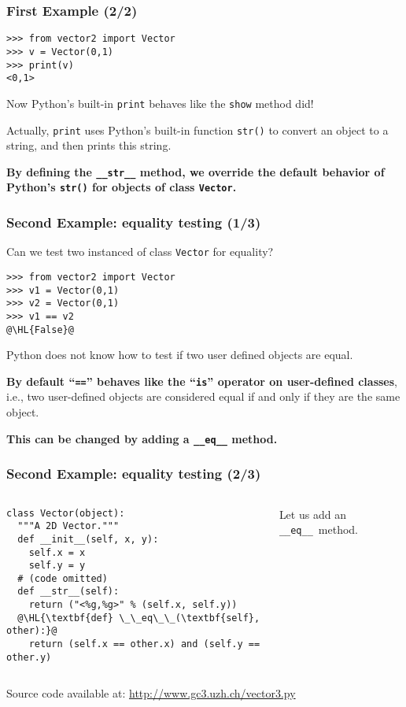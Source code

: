 \documentclass[english,serif,mathserif,xcolor=pdftex,dvipsnames,table]{beamer}
\begin{document}
\begin{frame}[fragile]
  \frametitle{First Example (2/2)}
\begin{lstlisting}
>>> from vector2 import Vector
>>> v = Vector(0,1)
>>> print(v)
<0,1>
\end{lstlisting}

  \+
  Now Python's built-in \texttt{print} behaves like the \texttt{show} method did!

  \+ Actually, \texttt{print} uses Python's built-in function
  \texttt{str()} to convert an object to a string, and then prints
  this string.

  \+ {\bfseries By defining the \lstinline|__str__| method, we
    override the default behavior of Python's \lstinline|str()| for
    objects of class \texttt{Vector}.}
\end{frame}


\begin{frame}[fragile]
  \frametitle{Second Example: equality testing (1/3)}

  Can we test two instanced of class \texttt{Vector} for equality?
\begin{lstlisting}
>>> from vector2 import Vector
>>> v1 = Vector(0,1)
>>> v2 = Vector(0,1)
>>> v1 == v2
@\HL{False}@
\end{lstlisting}

  \+ Python does not know how to test if two user defined objects are
  equal.

  \+ \textbf{By default ``\texttt{==}'' behaves like the
    ``\texttt{is}'' operator on user-defined classes}, i.e., two
  user-defined objects are considered equal if and only if they are
  the same object.

  \+ \textbf{This can be changed by adding a \lstinline|__eq__| method.}
\end{frame}


\begin{frame}[fragile]
  \frametitle{Second Example: equality testing (2/3)}
  \begin{columns}[t]
    \begin{column}{0.5\textwidth}
\begin{lstlisting}
class Vector(object):
  """A 2D Vector."""
  def __init__(self, x, y):
    self.x = x
    self.y = y
  # (code omitted)
  def __str__(self):
    return ("<%g,%g>" % (self.x, self.y))
  @\HL{\textbf{def} \_\_eq\_\_(\textbf{self}, other):}@
    return (self.x == other.x) and (self.y == other.y)
\end{lstlisting}
    \end{column}
    \begin{column}{0.5\textwidth}
      \raggedleft
      Let us add an \lstinline|__eq__|~method.
    \end{column}
  \end{columns}

  \+
  {\scriptsize Source code available at:
    \url{http://www.gc3.uzh.ch/vector3.py}}
\end{frame}
\end{document}
